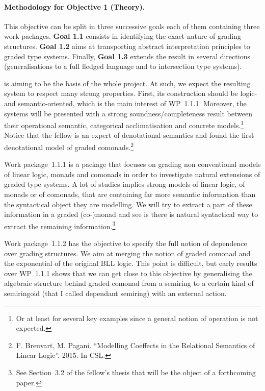 \documentclass{article}[11pt]
\begin{document}
\paragraph{Methodology for Objective 1 (Theory).}

This objective can be split in three successive goals each of them containing three work packages. {\bf Goal 1.1} consists in identifying the exact nature of grading structures. {\bf Goal 1.2} aims at transporting abstract interpretation principles to graded type systems. Finally, {\bf Goal 1.3} extends the result in several directions (generalisations to a full fledged language and to intersection type systems).

 is aiming to be the basis of the whole project. At such, we expect the resulting system to respect many strong properties. First, its construction should be logic- and semantic-oriented, which is the main interest of WP~1.1.1. Moreover, the systems will be presented with a strong soundness/completeness result between their operational semantic, categorical acclimatisation and concrete models.\footnote{Or at least for several key examples since a general notion of operation is not expected.} Notice that the fellow is an expert of denotational semantics and found the first denotational model of graded comonads.\footnote{F. Breuvart, M. Pagani. ``Modelling Coeffects in the Relational Semantics of Linear Logic''. 2015. In CSL.}

 Work package~1.1.1 is a package that focuses on grading non conventional models of linear logic, monads and comonads in order to investigate natural extensions of graded type systems. A lot of studies implies strong models of linear logic, of monads or of comonads, that are containing far more semantic information than the syntactical object they are modelling. We will try to extract a part of these information in a graded (co-)monad and see is there is natural syntactical way to extract the remaining information.\footnote{See Section~3.2 of the fellow's thesis that will be the object of a forthcoming paper.}

Work package~1.1.2 has the objective to specify the full notion of dependence over grading structures. We aim at merging the notion of graded comonad and the exponential of the original BLL logic. This point is difficult, but early results over WP~1.1.1 shows that we can get close to this objective by generalising the algebraic structure behind graded comonad from a semiring to a certain kind of semiringoid (that I called dependant semiring) with an external action.
\end{document}

